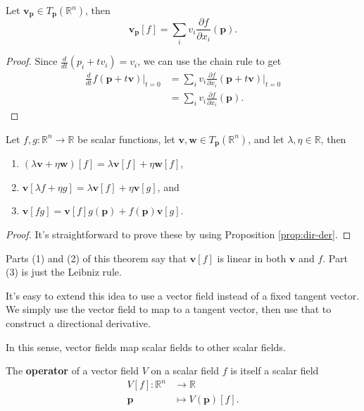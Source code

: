 \documentclass[twoside,10pt]{report}
\begin{document}
\begin{prop}
	\label{prop:dir-der}
	Let $\mathbf{v}_\mathbf{p} \in T_\mathbf{p}(\mathbb{R}^n)$, then
	\[
		\mathbf{v}_{\mathbf{p}}[f] = \sum_i v_i \frac{\partial f}{\partial x_i} (\mathbf{p}).
	\] 
\end{prop}
\begin{proof}
	Since $\frac{d }{d t} (p_i + tv_i) = v_i$, we can use the chain rule to get
	\begin{align*}
		\frac{d }{d t} f(\mathbf{p}+t\mathbf{v}) \Big|_{t=0} &= \sum_{i} v_i \frac{\partial f}{\partial x_i} (\mathbf{p}+t\mathbf{v}) \Big|_{t=0} \\
						   &= \sum_i v_i \frac{\partial f}{\partial x_i} (\mathbf{p}).
	\end{align*}
\end{proof}

\begin{thrm}
	\label{thrm:props-of-dir-der}
	Let $f,g:\mathbb{R}^n \to \mathbb{R}$ be scalar functions, let $\mathbf{v},\mathbf{w} \in T_\mathbf{p}(\mathbb{R}^n)$, and let $\lambda,\eta\in\mathbb{R}$, then
	\begin{enumerate}
		\item $(\lambda \mathbf{v} + \eta \mathbf{w})[f] = \lambda \mathbf{v}[f] + \eta \mathbf{w}[f]$,
		\item $\mathbf{v}[\lambda f + \eta g] = \lambda \mathbf{v}[f] + \eta \mathbf{v}[g]$, and
		\item $\mathbf{v}[fg] = \mathbf{v}[f] g(\mathbf{p}) + f(\mathbf{p}) \mathbf{v}[g]$.
	\end{enumerate}
\end{thrm}
\begin{proof}
	It's straightforward to prove these by using Proposition \ref{prop:dir-der}.
\end{proof}

Parts (1) and (2) of this theorem say that $\mathbf{v}[f]$ is linear in both $\mathbf{v}$ and $f$. Part (3) is just the Leibniz rule.

It's easy to extend this idea to use a vector field instead of a fixed tangent vector. We simply use the vector field to map to a tangent vector, then use that to construct a directional derivative.

\begin{note}
In this sense, vector fields map scalar fields to other scalar fields.
\end{note}

\begin{defn}
	The \textbf{operator} of a vector field $V$ on a scalar field $f$ is itself a scalar field
	\begin{align*}
		V[f]: \mathbb{R}^n &\to \mathbb{R} \\
		\mathbf{p} &\mapsto V(\mathbf{p})[f].
	\end{align*}
\end{defn}
\end{document}
